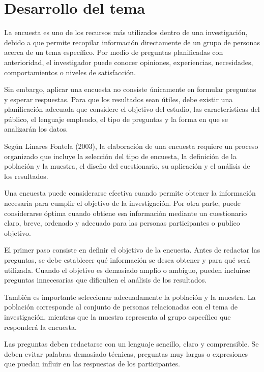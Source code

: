 \documentclass[12pt]{article}
\begin{document}
	
	\section*{Desarrollo del tema}
	
	La encuesta es uno de los recursos más utilizados dentro de una
	investigación, debido a que permite recopilar información directamente
	de un grupo de personas acerca de un tema específico. Por medio de
	preguntas planificadas con anterioridad, el investigador puede conocer
	opiniones, experiencias, necesidades, comportamientos o niveles de
	satisfacción.
	
	Sin embargo, aplicar una encuesta no consiste únicamente en formular
	preguntas y esperar respuestas. Para que los resultados sean útiles,
	debe existir una planificación adecuada que considere el objetivo del
	estudio, las características del público, el lenguaje empleado, el tipo
	de preguntas y la forma en que se analizarán los datos.
	
	Según Linares Fontela (2003), la elaboración de una encuesta requiere
	un proceso organizado que incluye la selección del tipo de encuesta,
	la definición de la población y la muestra, el diseño del cuestionario,
	su aplicación y el análisis de los resultados.
	
	Una encuesta puede considerarse efectiva cuando permite obtener la
	información necesaria para cumplir el objetivo de la investigación. Por
	otra parte, puede considerarse óptima cuando obtiene esa información
	mediante un cuestionario claro, breve, ordenado y adecuado para las
	personas participantes o publico objetivo.
	
	El primer paso consiste en definir el objetivo de la encuesta. Antes de
	redactar las preguntas, se debe establecer qué información se desea
	obtener y para qué será utilizada. Cuando el objetivo es demasiado
	amplio o ambiguo, pueden incluirse preguntas innecesarias que dificulten el
	análisis de los resultados.
	
	También es importante seleccionar adecuadamente la población y la muestra. La población corresponde al conjunto de personas relacionadas con el tema de investigación, mientras que la muestra representa al grupo específico que responderá la encuesta.
	
	Las preguntas deben redactarse con un lenguaje sencillo, claro y comprensible. Se deben evitar palabras demasiado técnicas, preguntas	muy largas o expresiones que puedan influir en las respuestas de los	participantes.
	
\end{document}
